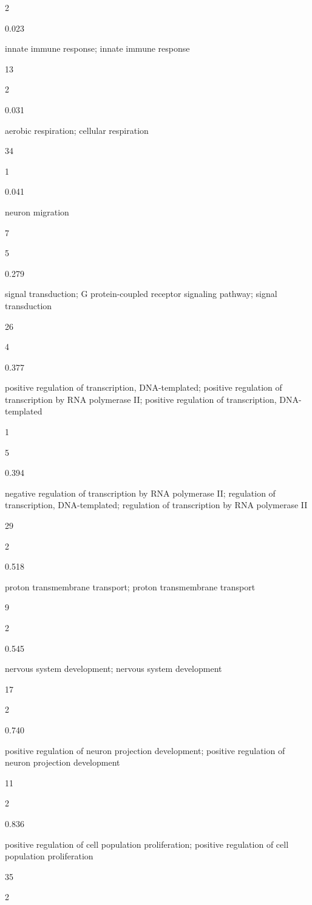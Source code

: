 \documentclass[
  letterpaper,
  DIV=11,
  numbers=noendperiod,
  openany,
  oneside]{scrreprt}
\begin{document}
2

0.023

innate immune response; innate immune response

13

2

0.031

aerobic respiration; cellular respiration

34

1

0.041

neuron migration

7

5

0.279

signal transduction; G protein-coupled receptor signaling pathway;
signal transduction

26

4

0.377

positive regulation of transcription, DNA-templated; positive regulation
of transcription by RNA polymerase II; positive regulation of
transcription, DNA-templated

1

5

0.394

negative regulation of transcription by RNA polymerase II; regulation of
transcription, DNA-templated; regulation of transcription by RNA
polymerase II

29

2

0.518

proton transmembrane transport; proton transmembrane transport

9

2

0.545

nervous system development; nervous system development

17

2

0.740

positive regulation of neuron projection development; positive
regulation of neuron projection development

11

2

0.836

positive regulation of cell population proliferation; positive
regulation of cell population proliferation

35

2
\end{document}
